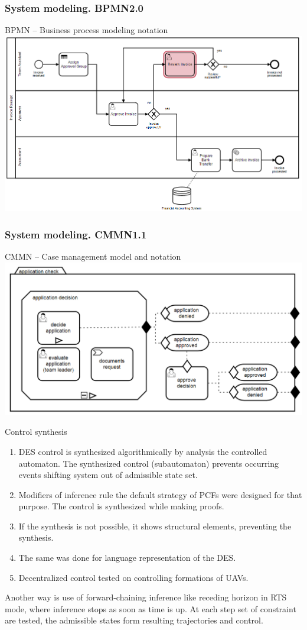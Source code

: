 \documentclass[10pt,dvipsnames]{beamer}
\begin{document}
\begin{frame}
  \frametitle{System modeling. BPMN2.0}
  BPMN -- Business process modeling notation
  \centering
    \includegraphics[width=1\linewidth]{qms-pics/bpmn.png}
\end{frame}
\begin{frame}
  \frametitle{System modeling. CMMN1.1}
  CMMN -- Case management model and notation
  \centering
    \includegraphics[width=1\linewidth]{qms-pics/cmmn.png}
\end{frame}


\begin{frame}{Control synthesis}
  \begin{enumerate}
  \item DES control is synthesized algorithmically by analysis the controlled automaton. The synthesized control (subautomaton) prevents occurring events shifting system out of admissible state set.
  \item Modifiers of inference rule the default strategy of PCFs were designed for that purpose. The control is synthesized while making proofs.
  \item If the synthesis is not possible, it shows structural elements, preventing the synthesis.
  \item The same was done for language representation of the DES.
  \item Decentralized control tested on controlling formations of UAVs.
  \end{enumerate}
  Another way is use of forward-chaining inference like receding horizon in RTS mode, where inference stops as soon as time is up.  At each step set of constraint are tested, the admissible states form resulting trajectories and control.
\end{frame}
\end{document}
